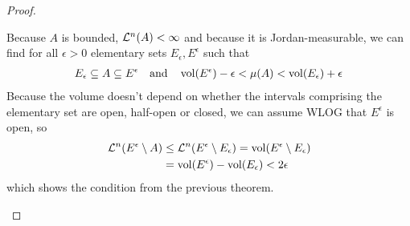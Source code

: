 \begin{proof}
\begin{enumerate}
    Because $A$ is bounded, $\mathcal{L}^{n}(A) < \infty$ and because it is Jordan-measurable, we can find for all $\epsilon > 0$ elementary sets $E_{\epsilon},E^{\epsilon}$ such that
    \begin{align*}
      E_{\epsilon} \subseteq A \subseteq E^{\epsilon}  \quad \text{and} \quad \vol(E^{\epsilon}) - \epsilon < \mu(A) < \vol(E_{\epsilon}) + \epsilon
    \end{align*}
    Because the volume doesn't depend on whether the intervals comprising the elementary set are open, half-open or closed, we can assume WLOG that $E^{\epsilon}$ is open, so
    \begin{align*}
      \Leb^{n}(E^{\epsilon} \setminus A)
      &\leq \Leb^{n}(E^{\epsilon} \setminus E_{\epsilon})
      =
      \vol(E^{\epsilon} \setminus E_{\epsilon})\\
      &=
      \vol(E^{\epsilon}) - \vol(E_{\epsilon}) < 2 \epsilon
    \end{align*}
    which shows the condition from the previous theorem.
\end{enumerate}
\end{proof}



